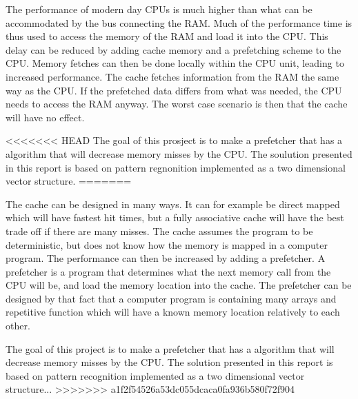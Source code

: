 The performance of modern day CPUs is much higher than what can be accommodated by the bus connecting the RAM. Much of the performance time is thus used to access the memory of the RAM and load it into the CPU. This delay can be reduced by adding cache memory and a prefetching scheme to the CPU. Memory fetches can then be done locally within the CPU unit, leading to increased performance. The cache fetches information from the RAM the same way as the CPU. If the prefetched data differs from what was needed, the CPU needs to access the RAM anyway. The worst case scenario is then that the cache will have no effect.


<<<<<<< HEAD
The goal of this prosject is to make a prefetcher that has a algorithm that will decrease memory misses by the CPU. The soulution presented in this report is based on pattern regnonition implemented as a two dimensional vector structure.
=======


The cache can be designed in many ways. It can for example be direct mapped which will have fastest hit times, but a fully associative cache will have the best trade off if there are many misses. The cache assumes the program to be deterministic, but does not know how the memory is mapped in a computer program. The performance can then be increased by adding a prefetcher. A prefetcher is a program that determines what the next memory call from the CPU will be, and load the memory location into the cache. The prefetcher can be designed by that fact that a computer program is containing many arrays and repetitive function which will have a known memory location relatively to each other.

The goal of this project is to make a prefetcher that has a algorithm that will decrease memory misses by the CPU. The solution presented in this report is based on pattern recognition implemented as a two dimensional vector structure...
>>>>>>> a1f2f54526a53dc055dcaca0fa936b580f72f904
